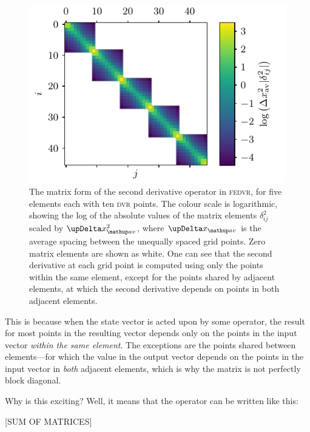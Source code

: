 \begin{figure}[t]
    \centerfloat
    \includegraphics{figures/numerics/fedvr_D2_operator.pdf}
    \caption{The matrix form of the second derivative operator in \textsc{fedvr}, for five elements each with ten \textsc{dvr} points. The colour scale is logarithmic, showing the log of the absolute values of the matrix elements $\delta^2_{ij}$ scaled by $\upDelta x_\up{av}^2$, where $\upDelta x_\up{av}$ is the average spacing between the unequally spaced grid points. Zero matrix elements are shown as white. One can see that the second derivative at each grid point is computed using only the points within the same element, except for the points shared by adjacent elements, at which the second derivative depends on points in both adjacent elements.}
    \label{fig:fedvr_D2_operator}
\end{figure}

 This is because when the state vector is acted upon by some operator, the result for most points in the resulting vector depends only on the points in the input vector \emph{within the same element}. The exceptions are the points shared between elements---for which the value in the output vector depends on the points in the input vector in \emph{both} adjacent elements, which is why the matrix is not perfectly block diagonal.

Why is this exciting? Well, it means that the operator can be written like this:

[SUM OF MATRICES]

